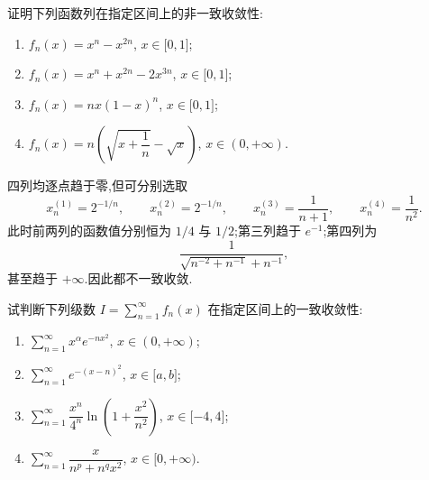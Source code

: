 \begin{example}
    证明下列函数列在指定区间上的非一致收敛性:
    \begin{enumerate}
        \item $f_n(x)=x^n-x^{2n}$, $x\in\lbrack 0,1\rbrack$;
        \item $f_n(x)=x^n+x^{2n}-2x^{3n}$, $x\in\lbrack 0,1\rbrack$;
        \item $f_n(x)=nx(1-x)^n$, $x\in\lbrack 0,1\rbrack$;
        \item $f_n(x)=n\left(\sqrt{x+\dfrac{1}{n}}-\sqrt{x}\right)$, $x\in(0,+\infty)$.
    \end{enumerate}
\end{example}
\exampleblank

\begin{solution}
    四列均逐点趋于零,但可分别选取
    \[
        x_n^{(1)}=2^{-1/n},\qquad x_n^{(2)}=2^{-1/n},\qquad
        x_n^{(3)}=\dfrac{1}{n+1},\qquad x_n^{(4)}=\dfrac{1}{n^2}.
    \]
    此时前两列的函数值分别恒为 $1/4$ 与 $1/2$;第三列趋于 $e^{-1}$;第四列为
    \[
        \dfrac{1}{\sqrt{n^{-2}+n^{-1}}+n^{-1}},
    \]
    甚至趋于 $+\infty$.因此都不一致收敛.
\end{solution}

\begin{example}
    试判断下列级数 $\displaystyle I=\sum\limits_{n=1}^{\infty}f_n(x)$ 在指定区间上的一致收敛性:
    \begin{enumerate}
        \item $\displaystyle\sum\limits_{n=1}^{\infty}x^\alpha e^{-nx^2}$, $x\in(0,+\infty)$;
        \item $\displaystyle\sum\limits_{n=1}^{\infty}e^{-(x-n)^2}$, $x\in\lbrack a,b\rbrack$;
        \item $\displaystyle\sum\limits_{n=1}^{\infty}\dfrac{x^n}{4^n}\ln\left(1+\dfrac{x^2}{n^2}\right)$, $x\in\lbrack -4,4\rbrack$;
        \item $\displaystyle\sum\limits_{n=1}^{\infty}\dfrac{x}{n^p+n^q x^2}$, $x\in\lbrack 0,+\infty)$.
    \end{enumerate}
\end{example}
\exampleblank

